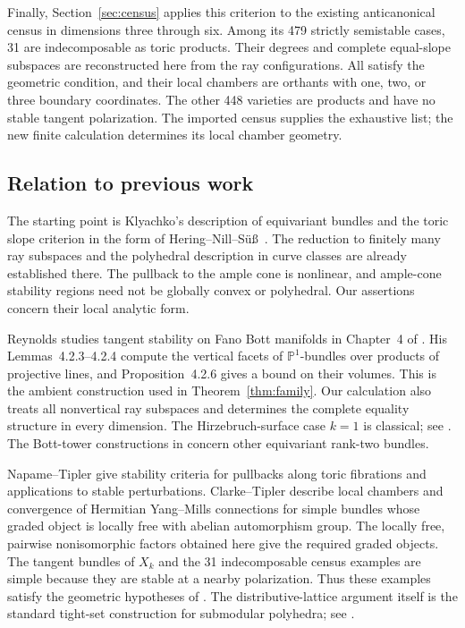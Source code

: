 \documentclass[11pt]{amsart}
\theoremstyle{definition}
\theoremstyle{remark}
\newcommand{\PP}{\mathbb P}
\begin{document}
Finally, Section~\ref{sec:census} applies this criterion to the existing
anticanonical census in dimensions three through six. Among its 479
strictly semistable cases, 31 are indecomposable as toric products.
Their degrees and complete equal-slope subspaces are reconstructed here
from the ray configurations. All satisfy the geometric condition, and
their local chambers are orthants with one, two, or three boundary
coordinates. The other 448 varieties are products and have no stable
tangent polarization. The imported census supplies the exhaustive list;
the new finite calculation determines its local chamber geometry.

\subsection*{Relation to previous work}
The starting point is Klyachko's description of equivariant bundles
\cite{Klyachko} and the toric slope criterion in the form of
Hering--Nill--S\"u\ss\ \cite{HNS}. The reduction to finitely many ray
subspaces and the polyhedral description in curve classes are already
established there. The pullback to the ample cone is nonlinear, and
ample-cone stability regions need not be globally convex or polyhedral.
Our assertions concern their local analytic form.

Reynolds studies tangent stability on Fano Bott manifolds in Chapter~4
of \cite{Reynolds}. His Lemmas~4.2.3--4.2.4 compute the vertical facets
of $\PP^1$-bundles over products of projective lines, and
Proposition~4.2.6 gives a bound on their volumes. This is the ambient
construction used in Theorem~\ref{thm:family}. Our calculation also treats
all nonvertical ray subspaces and determines the complete equality
structure in every dimension. The Hirzebruch-surface case $k=1$ is
classical; see \cite[Section~6]{BDGP}. The Bott-tower constructions in
\cite[Section~6]{DDK} concern other equivariant rank-two bundles.

Napame--Tipler \cite{NT} give stability criteria for pullbacks along
toric fibrations and applications to stable perturbations.
Clarke--Tipler \cite{CT} describe local chambers and convergence of
Hermitian Yang--Mills connections for simple bundles whose graded object
is locally free with abelian automorphism group. The locally free, pairwise
nonisomorphic factors obtained here give the required graded objects.
The tangent bundles of $X_k$ and the 31 indecomposable census examples
are simple because they are stable at a nearby polarization. Thus these
examples satisfy the geometric hypotheses of \cite{CT}.
The distributive-lattice argument itself is the standard tight-set
construction for submodular polyhedra; see \cite{Fujishige}.
\end{document}
